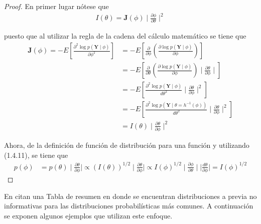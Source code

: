 \begin{proof}
En primer lugar nótese que
\begin{align*}
I(\theta)=\mathbf{J}(\phi) \mid \frac{\partial\phi}{\partial\theta} \mid ^{2}
\end{align*}

puesto que al utilizar la regla de la cadena del cálculo matemático se tiene que
\begin{align*}
\mathbf{J}(\phi)= - E\left[\frac{\partial^2 \log p(\mathbf{Y} \mid \phi)}{\partial\phi^2}\right]
&= - E\left[\frac{\partial}{\partial\phi}\left(\frac{\partial \log p(\mathbf{Y} \mid \phi)}{\partial\phi}\right)\right]\\
&= - E\left[\frac{\partial}{\partial\theta}\left(\frac{\partial \log p(\mathbf{Y} \mid \phi)}{\partial\phi}\right) \mid \frac{\partial\theta}{\partial\phi} \mid \right]\\
&= - E\left[\frac{\partial^2 \log p(\mathbf{Y} \mid \phi)}{d\theta^2} \mid \frac{\partial\theta}{\partial\phi} \mid ^{2}\right]\\
&= - E\left[\frac{\partial^2 \log p(\mathbf{Y} \mid \theta =h^{-1}(\phi))}{d\theta^2} \mid \frac{\partial\theta}{\partial\phi} \mid ^{2}\right]\\
&= I(\theta) \mid \frac{\partial\theta}{\partial\phi} \mid ^{2}
\end{align*}

Ahora, de la definición de función de distribución para una función y utilizando (1.4.11), se tiene que
\begin{align*}
p(\phi)&=p(\theta) \mid \frac{\partial\theta}{\partial\phi} \mid
\propto (I(\theta))^{1/2} \mid \frac{\partial\theta}{\partial\phi} \mid
\propto I(\phi)^{1/2} \mid \frac{\partial\phi}{\partial\theta} \mid  \mid \frac{d\theta}{\partial\phi} \mid =I(\phi)^{1/2}
\end{align*}
\end{proof}

En  citan una Tabla de resumen en donde se encuentran distribuciones a previa no informativas para las distribuciones probabilísticas más comunes. A continuación se exponen algunos ejemplos que utilizan este enfoque.

